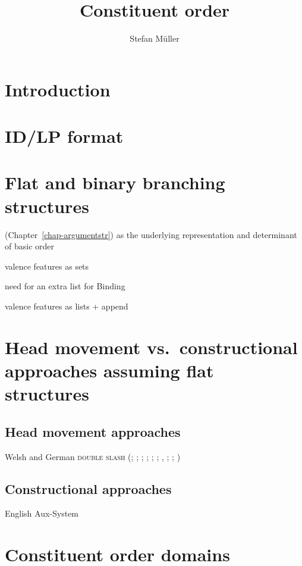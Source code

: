 \documentclass[output=paper]{langsci/langscibook}
\author{%
	Stefan Müller\affiliation{Humboldt-Universität zu Berlin}%
}
\title{Constituent order}
\begin{document}
\label{chap:constituents}

\section{Introduction} 



\section{ID/LP format}

\citet*{GKPS85a}

\section{Flat and binary branching structures}

\argst (Chapter~\ref{chap-argumentstr}) as the underlying representation and determinant of basic order

valence features as sets \citep*{Gunji86a,HN89a,Pollard90a,EEU92a}

need for an extra list for Binding 

\citet{AMM2013a}

valence features as lists + append \citep{MuellerHPSGHandbook}


\section{Head movement vs.\ constructional approaches assuming flat structures}

\subsection{Head movement approaches}

Welsh \citep{Borsley89} and German \textsc{double slash} 
(\citealp*[Section~4.7]{KW91a}; \citealp{Oliva92a}; \citealp*{Netter92};   
\citealp*{Kiss93}; \citealp*{Frank94}; \citealp*{Kiss95a}; \citealp{Feldhaus97},
\citealp{Meurers2000b}; \citealp{Mueller2005c}; \citealp{MuellerGS})

\subsection{Constructional approaches}

English Aux-System \citep{Fillmore99a,Sag2018a}

\section{Constituent order domains}
\end{document}
